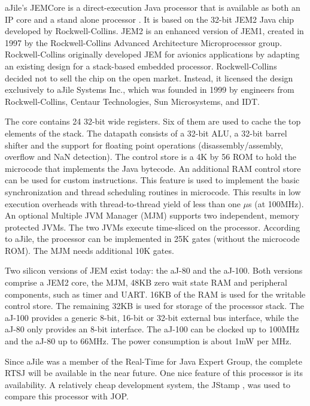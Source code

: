 aJile's JEMCore is a direct-execution Java processor that is
available as both an IP core and a stand alone processor
\cite{aJile, 880720}. It is based on the 32-bit JEM2 Java chip
developed by Rockwell-Collins. JEM2 is an enhanced version of JEM1,
created in 1997 by the Rockwell-Collins Advanced Architecture
Microprocessor group. Rockwell-Collins originally developed JEM for
avionics applications by adapting an existing design for a
stack-based embedded processor. Rockwell-Collins decided not to sell
the chip on the open market. Instead, it licensed the design
exclusively to aJile Systems Inc., which was founded in 1999 by
engineers from Rockwell-Collins, Centaur Technologies, Sun
Microsystems, and IDT.


The core contains 24 32-bit wide registers. Six of them are used to
cache the top elements of the stack. The datapath consists of a
32-bit ALU, a 32-bit barrel shifter and the support for floating
point operations (disassembly/assembly, overflow and NaN detection).
The control store is a 4K by 56 ROM to hold the microcode that
implements the Java bytecode. An additional RAM control store can be
used for custom instructions. This feature is used to implement the
basic synchronization and thread scheduling routines in microcode.
This results in low execution overheads with thread-to-thread yield
of less than one $\mu$s (at 100MHz). An optional Multiple JVM
Manager (MJM) supports two independent, memory protected JVMs. The
two JVMs execute time-sliced on the processor. According to aJile,
the processor can be implemented in 25K gates (without the microcode
ROM). The MJM needs additional 10K gates.

Two silicon versions of JEM exist today: the aJ-80 and the aJ-100.
Both versions comprise a JEM2 core, the MJM, 48KB zero wait state
RAM and peripheral components, such as timer and UART. 16KB of the
RAM is used for the writable control store. The remaining 32KB is
used for storage of the processor stack. The aJ-100 provides a
generic 8-bit, 16-bit or 32-bit external bus interface, while the
aJ-80 only provides an 8-bit interface. The aJ-100 can be clocked up
to 100MHz and the aJ-80 up to 66MHz. The power consumption is about
1mW per MHz.

Since aJile was a member of the Real-Time for Java Expert Group, the
complete RTSJ will be available in the near future. One nice feature
of this processor is its availability. A relatively cheap
development system, the JStamp \cite{JStamp}, was used to compare
this processor with JOP.

